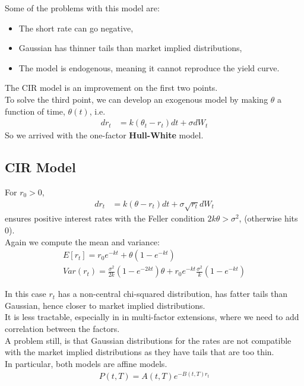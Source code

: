 Some of the problems with this model are:
\begin{itemize}
    \item The short rate can go negative,
    \item Gaussian has thinner tails than market implied distributions, 
    \item The model is endogenous, meaning it cannot reproduce the yield curve.
\end{itemize}
The CIR model is an improvement on the first two points.\\
To solve the third point, we can develop an exogenous model by making
$\theta$ a function of time, $\theta(t)$, i.e.
\begin{align*}
    dr_t &= k(\theta_t-r_t)dt + \sigma dW_t
\end{align*}
So we arrived with the one-factor \textbf{Hull-White} model.\\

\subsection{CIR Model}
For $r_0 > 0$, 
\begin{align*}
dr_t &= k(\theta-r_t)dt + \sigma \sqrt{r_t} dW_t
\end{align*}
ensures positive interest rates with the Feller condition $2k\theta > \sigma^2$, 
(otherwise hits 0).\\
Again we compute the mean and variance:
\begin{align*}
    E[r_t] = r_0 e^{-kt} + \theta(1-e^{-kt})\\
    Var(r_t) = \frac{\sigma^2}{2k}(1-e^{-2kt})\theta + 
    r_0 e^{-kt}\frac{\sigma^2}{k}(1-e^{-kt})
\end{align*}

In this case $r_t$ has a non-central chi-squared distribution, 
has fatter tails than Gaussian, hence closer to market implied distributions.\\
It is less tractable, especially in in multi-factor extensions,
where we need to add correlation between the factors.\\

A problem still, is that Gaussian distributions for the rates are not compatible with the market
implied distributions as they have tails that are too thin.\\

In particular, both models are affine models.
\begin{align*}
    P(t, T) = A(t, T) e^{-B(t, T)r_t}
\end{align*}

